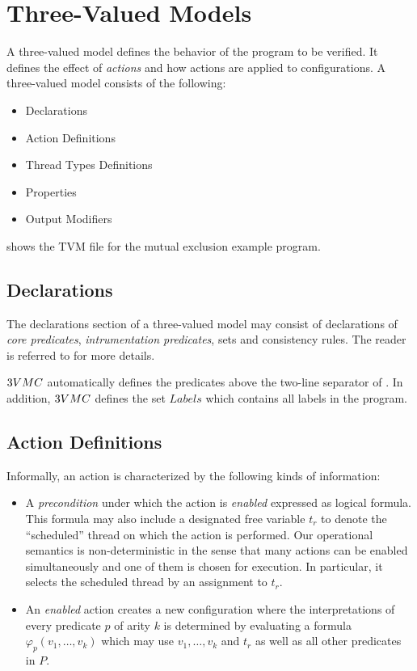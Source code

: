 \section{Three-Valued Models}

A three-valued model defines the behavior of the program to be
verified. It defines the effect of \emph{actions} and how actions
are applied to configurations. A three-valued model consists of
the following:
\begin{itemize}
\item Declarations
\item Action Definitions
\item Thread Types Definitions
\item Properties
\item Output Modifiers
\end{itemize}



 shows the TVM file for the mutual exclusion
example program.

\subsection{Declarations}

The declarations section of a three-valued model may consist of
declarations of \emph{core predicates}, \emph{intrumentation
predicates}, sets and consistency rules. The reader is referred to
\cite{kn:TalSAS00} for more details.

$\tvmc$ automatically defines the predicates above the two-line
separator of . In addition, $\tvmc$ defines
the set $Labels$ which contains all labels in the program.


\subsection{Action Definitions}

Informally, an action is characterized by the following kinds of
information:
\begin{itemize}
\item A {\em precondition\/} under which the action is \emph{enabled} expressed
as logical formula. This formula may also include a designated
free variable $t_r$ to denote the ``scheduled'' thread on which
the action is performed. Our operational semantics is
non-deterministic in the sense that many actions can be enabled
simultaneously and one of them is chosen for execution. In
particular, it selects the scheduled thread by an assignment to
$t_r$.

\item An \emph{enabled} action creates a new configuration where the
interpretations of every predicate $p$ of arity $k$ is determined
by evaluating a formula $\varphi_p(v_1, \ldots, v_k)$ which may
use $v_1, \ldots, v_k$ and $t_r$ as well as all other predicates
in $P$.
\end{itemize}

